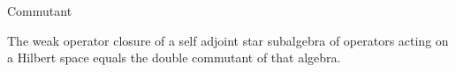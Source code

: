 %

\begin{definition}\label{commutant}
Commutant
\end{definition}

\begin{theorem}
  \label{thm:double_commutant}
  \leanok
  The weak operator closure of a self adjoint star subalgebra of operators acting on a Hilbert space equals the double commutant of that algebra.
\end{theorem}
